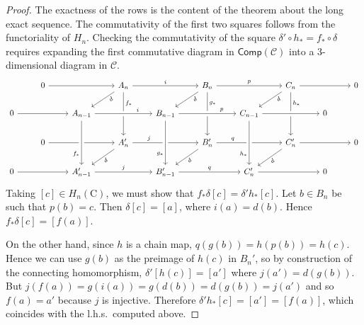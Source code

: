 \documentclass[english,letterpaper]{article}%
\numberwithin{equation}{section}
\numberwithin{figure}{section}
\numberwithin{table}{section}
\theoremstyle{definition}
\theoremstyle{definition}
\theoremstyle{definition}
\theoremstyle{plain}
\theoremstyle{plain}
\theoremstyle{plain}
\theoremstyle{plain}
\theoremstyle{remark}
\theoremstyle{remark}
\newcommand{\calC}{\mathcal{C}}
\newcommand{\bm}[1]{\boldsymbol{\mathrm{#1}}}
\begin{document}
\begin{proof}
     The exactness of the rows is the content of the theorem about the long exact sequence. The commutativity of the first two squares follows from the functoriality of $H_n$. Checking the commutativity of the square $\delta'\circ h_\ast=f_\ast\circ \delta$ requires expanding the first commutative diagram in $\mathsf{Comp}(\calC)$ into a 3-dimensional diagram in $\calC$.
     \[
     \begin{tikzcd}
        &
        0 
        \ar{rr}
        & &
        A_n
        \ar{dl}[swap, sloped, near start]{d}
        \ar{rr}{i}
        \ar[]{dd}[near start]{f_\ast}
        & & B_n
        \ar{dd}[near start]{g_\ast}
        \ar{rr}{p}
        \ar{dl}[swap, sloped, near start]{d}
        & & C_n
        \ar{dd}[near start]{h_\ast}
        \ar{dl}[swap, sloped, near start]{d}
        \ar{rr}
        & &
        0
        \\
        0
        \ar{rr}
        & &
        A_{n-1}
        \ar[crossing over]{rr}[near end]{i}
        & & B_{n-1}
        \ar[crossing over]{rr}[near end]{p}
        & & C_{n-1}
        \ar[crossing over]{rr}
        & &
        0
        \\
        &
        0
        \ar{rr}
        & &
        A_n'
        \ar[near start]{rr}{j}
        \ar[sloped, swap]{dl}{d}
        & & B_n'
        \ar[near start]{rr}{q}
        \ar[sloped, swap]{dl}{d}
        & & C_n'
        \ar[sloped, swap]{dl}{d}
        \ar{rr}
        & &
        0
        \\
        0
        \ar{rr}
        & &
        A_{n-1}'
        \ar{rr}{j}
        \ar[crossing over, leftarrow, near start]{uu}{f_\ast}
        & & B_{n-1}'
        \ar{rr}{q}
        \ar[crossing over, leftarrow, near start]{uu}{g_\ast}
        & & C_n'
        \ar[crossing over, leftarrow, near start]{uu}{h_\ast}
        \ar{rr}
        & &
        0
        \end{tikzcd}
     \]
     Taking $[c]\in H_n(\bm{C})$, we must show that $f_\ast\delta [c]=\delta ' h_\ast [c]$. Let $b\in B_n$ be such that $p(b)=c$. Then $\delta [c]=[a]$, where $i(a)=d(b)$. Hence $f_\ast \delta [c]=[f(a)]$. 
     
     On the other hand, since $h$ is a chain map, $q(g(b))=h(p(b))=h(c)$. Hence we can use $g(b)$ as the preimage of $h(c)$ in $B_n'$, so by construction of the connecting homomorphism, $\delta '[h(c)]=[a']$ where $j(a')=d(g(b))$. But $j(f(a))=g(i(a))=g(d(b))=d(g(b))=j(a')$ and so $f(a)=a'$ because $j$ is injective. Therefore $\delta'h_\ast [c]=[a']=[f(a)]$, which coincides with the l.h.s.\ computed above.
\end{proof}
\end{document}
